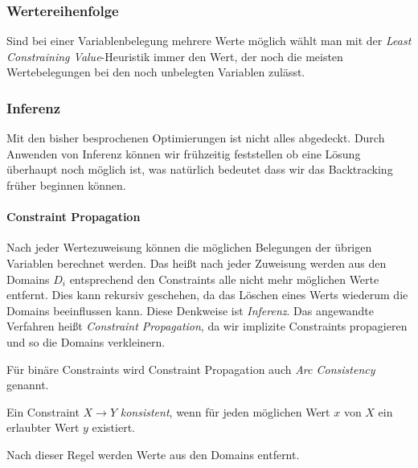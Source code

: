 \subsubsection{Wertereihenfolge}
Sind bei einer Variablenbelegung mehrere Werte möglich wählt man mit der \emph{Least Constraining Value}-Heuristik immer den Wert, der noch die meisten Wertebelegungen bei den noch unbelegten Variablen zulässt.

\subsubsection{Inferenz}
Mit den bisher besprochenen Optimierungen ist nicht alles abgedeckt. Durch Anwenden von Inferenz können wir frühzeitig feststellen ob eine Lösung überhaupt noch möglich ist, was natürlich bedeutet dass wir das Backtracking früher beginnen können.
\paragraph{Constraint Propagation}
Nach jeder Wertezuweisung können die möglichen Belegungen der übrigen Variablen berechnet werden. Das heißt nach jeder Zuweisung werden aus den Domains $D_i$ entsprechend den Constraints alle nicht mehr möglichen Werte entfernt. Dies kann rekursiv geschehen, da das Löschen eines Werts wiederum die Domains beeinflussen kann.
Diese Denkweise ist \emph{Inferenz}. Das angewandte Verfahren heißt \emph{Constraint Propagation}, da wir implizite Constraints propagieren und so die Domains verkleinern.

Für binäre Constraints wird Constraint Propagation auch \emph{Arc Consistency} genannt. 
\begin{definition}
	Ein Constraint $X\rightarrow Y$ \emph{konsistent}, wenn für jeden möglichen Wert $x$ von $X$ ein erlaubter Wert $y$ existiert.
\end{definition}
Nach dieser Regel werden Werte aus den Domains entfernt.

